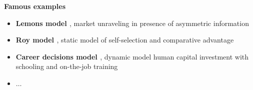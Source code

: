 \begin{frame}\textbf{Famous examples}\vspace{0.3cm}

\begin{itemize}\setlength\itemsep{1em}
\item \textbf{Lemons model \cite{Akerlof.1970}}, market unraveling in presence of asymmetric information
\item \textbf{Roy model \cite{Roy.1951}}, static model of self-selection and comparative advantage
\item \textbf{Career decisions model \cite{Keane.1997}}, dynamic model human capital investment with schooling and on-the-job training
\item $\hdots$
\end{itemize}

\end{frame}
